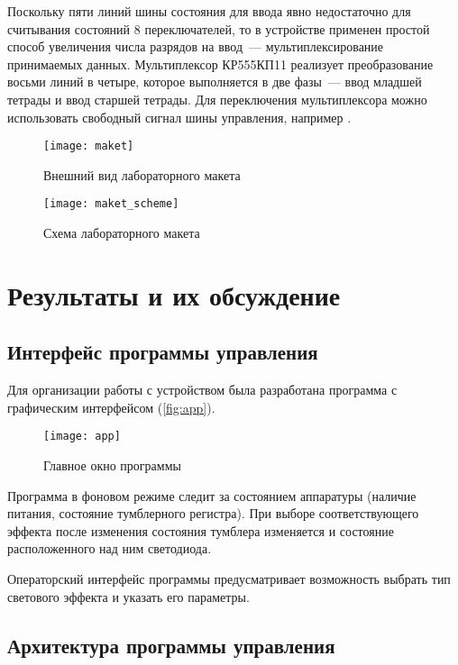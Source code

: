 Поскольку пяти линий шины состояния для ввода явно недостаточно для считывания состояний 8 переключателей, то в устройстве применен простой способ увеличения числа разрядов на ввод~--- мультиплексирование принимаемых данных. Мультиплексор КР555КП11 реализует преобразование восьми линий в четыре, которое выполняется в две фазы~--- ввод младшей тетрады и ввод старшей тетрады. Для переключения мультиплексора можно использовать свободный сигнал шины управления, например .

\begin{figure}[h]%
    \centering
    \texttt{[image: maket]}%
    \caption[]{Внешний вид лабораторного макета}%
    \label{fig:maket}%
\end{figure}
%
\begin{figure}[h]%
    \centering
    \texttt{[image: maket\_scheme]}%
    \caption[]{Схема лабораторного макета}%
    \label{fig:maket_scheme}%
\end{figure}

\section{Результаты и их обсуждение}

\subsection{Интерфейс программы управления}

Для организации работы с устройством была разработана программа с графическим интерфейсом (\autoref{fig:app}).

\begin{figure}[h]%
\centering
\texttt{[image: app]}%
\caption[]{Главное окно программы}%
\label{fig:app}%
\end{figure}

Программа в фоновом режиме следит за состоянием аппаратуры (наличие питания, состояние тумблерного регистра). При выборе соответствующего эффекта после изменения состояния тумблера изменяется и состояние расположенного над ним светодиода.

Операторский интерфейс программы предусматривает возможность выбрать тип светового эффекта и указать его параметры.

\subsection{Архитектура программы управления}


